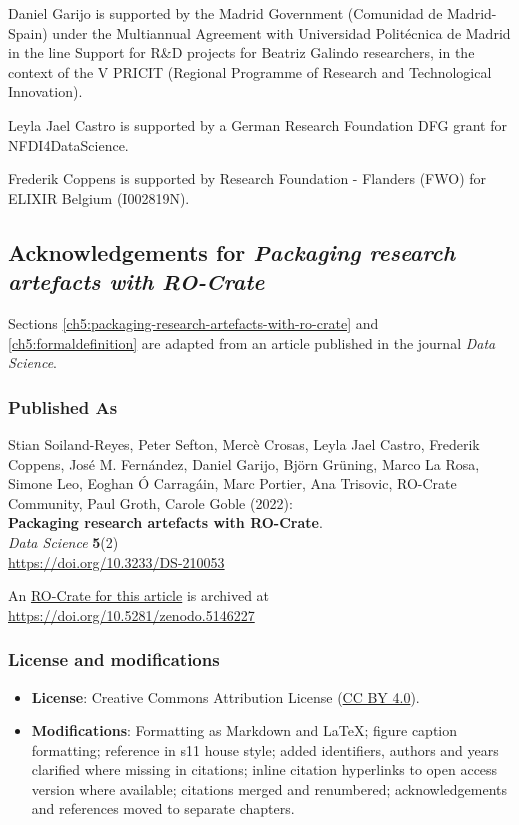 Daniel Garijo is supported by the Madrid Government (Comunidad de
Madrid-Spain) under the Multiannual Agreement with Universidad
Politécnica de Madrid in the line Support for R\&D projects for Beatriz
Galindo researchers, in the context of the V PRICIT (Regional Programme
of Research and Technological Innovation).

Leyla Jael Castro is supported by a German Research Foundation DFG grant
for NFDI4DataScience.

Frederik Coppens is supported by Research Foundation - Flanders (FWO)
for ELIXIR Belgium (I002819N).



\subsection{Acknowledgements for \emph{Packaging research artefacts with RO-Crate}}

Sections \vref{ch5:packaging-research-artefacts-with-ro-crate} and \vref{ch5:formaldefinition} are adapted from an article published in the journal \emph{Data Science}.

\subsubsection*{Published As}

Stian Soiland-Reyes, Peter Sefton, Mercè Crosas, Leyla Jael Castro,
Frederik Coppens, José M. Fernández, Daniel Garijo, Björn Grüning, Marco
La Rosa, Simone Leo, Eoghan Ó Carragáin, Marc Portier, Ana Trisovic,
RO-Crate Community, Paul Groth, Carole Goble (2022):\\
\textbf{Packaging research artefacts with RO-Crate}.\\
\emph{Data Science} \textbf{5}(2)\\
\url{https://doi.org/10.3233/DS-210053}

An \href{https://w3id.org/ro/doi/10.5281/zenodo.5146227}{RO-Crate for
this article} is archived at
\url{https://doi.org/10.5281/zenodo.5146227}

\subsubsection*{License and modifications}

\begin{itemize}
\tightlist
\item
  \textbf{License}: Creative Commons Attribution License
  (\href{https://spdx.org/licenses/CC-BY-4.0}{CC BY 4.0}).
\item
  \textbf{Modifications}: Formatting as Markdown and LaTeX; figure caption
  formatting; reference in s11 house style; added identifiers, authors
  and years clarified where missing in citations; inline citation
  hyperlinks to open access version where available; citations merged and renumbered; 
  acknowledgements and references moved to separate chapters.
\end{itemize}


